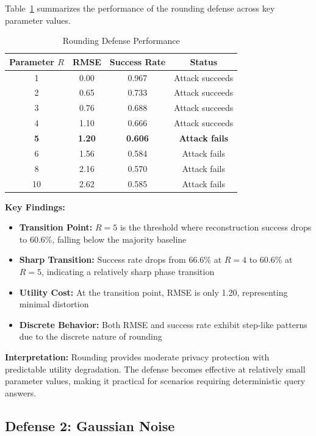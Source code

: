 \documentclass[11pt,letterpaper]{article}
\begin{document}
Table~\ref{tab:rounding} summarizes the performance of the rounding defense across key parameter values.

\begin{table}[H]
\centering
\caption{Rounding Defense Performance}
\label{tab:rounding}
\begin{tabular}{@{}cccc@{}}
\toprule
\textbf{Parameter $R$} & \textbf{RMSE} & \textbf{Success Rate} & \textbf{Status} \\ \midrule
1 & 0.00 & 0.967 & Attack succeeds \\
2 & 0.65 & 0.733 & Attack succeeds \\
3 & 0.76 & 0.688 & Attack succeeds \\
4 & 1.10 & 0.666 & Attack succeeds \\
\textbf{5} & \textbf{1.20} & \textbf{0.606} & \textbf{Attack fails} \\
6 & 1.56 & 0.584 & Attack fails \\
8 & 2.16 & 0.570 & Attack fails \\
10 & 2.62 & 0.585 & Attack fails \\ \bottomrule
\end{tabular}
\end{table}

\textbf{Key Findings:}

\begin{itemize}[leftmargin=*]
    \item \textbf{Transition Point:} $R = 5$ is the threshold where reconstruction success drops to 60.6\%, falling below the majority baseline
    \item \textbf{Sharp Transition:} Success rate drops from 66.6\% at $R=4$ to 60.6\% at $R=5$, indicating a relatively sharp phase transition
    \item \textbf{Utility Cost:} At the transition point, RMSE is only 1.20, representing minimal distortion
    \item \textbf{Discrete Behavior:} Both RMSE and success rate exhibit step-like patterns due to the discrete nature of rounding
\end{itemize}

\textbf{Interpretation:} Rounding provides moderate privacy protection with predictable utility degradation. The defense becomes effective at relatively small parameter values, making it practical for scenarios requiring deterministic query answers.

\subsection{Defense 2: Gaussian Noise}
\end{document}
